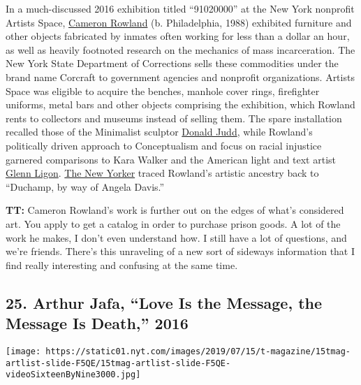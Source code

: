 In a much-discussed 2016 exhibition titled ``91020000'' at the New York
nonprofit Artists Space,
\href{http://www.essexstreet.biz/artist/rowland}{Cameron Rowland} (b.
Philadelphia, 1988) exhibited furniture and other objects fabricated by
inmates often working for less than a dollar an hour, as well as heavily
footnoted research on the mechanics of mass incarceration. The New York
State Department of Corrections sells these commodities under the brand
name Corcraft to government agencies and nonprofit organizations.
Artists Space was eligible to acquire the benches, manhole cover rings,
firefighter uniforms, metal bars and other objects comprising the
exhibition, which Rowland rents to collectors and museums instead of
selling them. The spare installation recalled those of the Minimalist
sculptor
\href{https://www.nytimes.com/1994/02/13/obituaries/donald-judd-leading-minimalist-sculptor-dies-at-65.html}{Donald
Judd}, while Rowland's politically driven approach to Conceptualism and
focus on racial injustice garnered comparisons to Kara Walker and the
American light and text artist
\href{https://www.nytimes.com/2018/06/18/t-magazine/glenn-ligon-adrian-piper-art.html}{Glenn
Ligon}.
\href{https://www.newyorker.com/goings-on-about-town/art/cameron-rowland}{The
New Yorker} traced Rowland's artistic ancestry back to ``Duchamp, by way
of Angela Davis.''

\textbf{TT:} Cameron Rowland's work is further out on the edges of
what's considered art. You apply to get a catalog in order to purchase
prison goods. A lot of the work he makes, I don't even understand how. I
still have a lot of questions, and we're friends. There's this
unraveling of a new sort of sideways information that I find really
interesting and confusing at the same time.

\hypertarget{25-arthur-jafa-love-is-the-message-the-message-is-death-2016}{%
\subsection{25. Arthur Jafa, ``Love Is the Message, the Message Is
Death,''
2016}\label{25-arthur-jafa-love-is-the-message-the-message-is-death-2016}}

\texttt{[image: https://static01.nyt.com/images/2019/07/15/t-magazine/15tmag-artlist-slide-F5QE/15tmag-artlist-slide-F5QE-videoSixteenByNine3000.jpg]}

